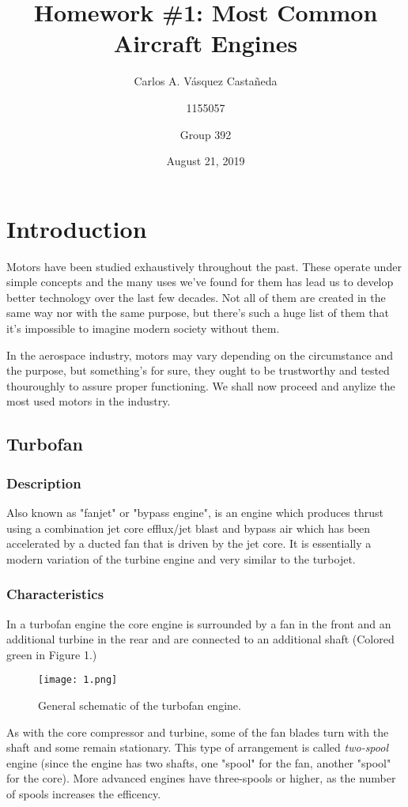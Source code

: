 \documentclass[12pt, letterpaper]{article}
\title{Homework \#1: Most Common Aircraft Engines}
\author{Carlos A. Vásquez Castañeda \and 1155057 \and Group 392}
\date{August 21, 2019}
\begin{document}
\maketitle
\section*{Introduction}
Motors have been studied exhaustively throughout the past. These operate under simple concepts and the many uses we've found for them has lead us to develop better technology over the last few decades. Not all of them are created in the same way nor with the same purpose, but there's such a huge list of them that it's impossible to imagine modern society without them.

In the aerospace industry, motors may vary depending on the circumstance and the purpose, but something's for sure, they ought to be trustworthy and tested thouroughly to assure proper functioning. We shall now proceed and anylize the most used motors in the industry.

\subsection*{Turbofan}
\subsubsection*{Description}
Also known as "fanjet" or "bypass engine", is an engine which produces thrust using a combination jet core efflux/jet blast and bypass air which has been accelerated by a ducted fan that is driven by the jet core.\autocite{skybrary16}
It is essentially a modern variation of the turbine engine and very similar to the turbojet.
\subsubsection*{Characteristics}
In a turbofan engine the core engine is surrounded by a fan in the front and an additional turbine in the rear and are connected to an additional shaft (Colored green in Figure 1.)
\begin{figure}[H]
	\centering
	\texttt{[image: 1.png]}
	\caption{General schematic of the turbofan engine.}
\end{figure}
As with the core compressor and turbine, some of the fan blades turn with the shaft and some remain stationary. This type of arrangement is called \textit{two-spool} engine (since the engine has two shafts, one "spool" for the fan, another "spool" for the core). More advanced engines have three-spools or higher, as the number of spools increases the efficency.
\end{document}
